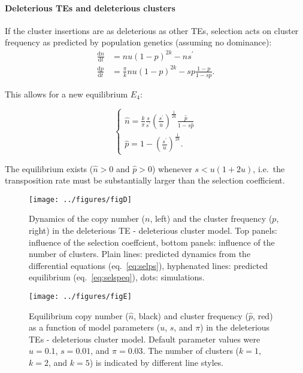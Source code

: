 \documentclass[10pt,a4paper]{article}
\begin{document}
\paragraph{Deleterious TEs and deleterious clusters} If the cluster insertions are as deleterious as other TEs, selection acts on cluster frequency as predicted by population genetics (assuming no dominance): 
\begin{equation}\label{eq:selps}
\begin{split}
\frac{\mathrm d n}{\mathrm d t} &= n u (1-p)^{2k} - n s^\prime \\
\frac{\mathrm d p}{\mathrm d t} &= \frac{\pi}{k} n u (1-p)^{2k} - s p \frac{1-p}{1- s p}.
\end{split}
\end{equation}

This allows for a new equilibrium $E_4$:

\begin{equation}\label{eq:selpseq}
\begin{cases}
\displaystyle \hat n = \frac{k}{\pi}\frac{s}{s^\prime} \left(\frac{s^\prime}{u}\right)^\frac{1}{2k}\frac{\hat p}{1-s\hat p} \\
\displaystyle \hat p = 1 - \left(\frac{s^\prime}{u}\right)^\frac{1}{2k}.
\end{cases}
\end{equation}

The equilibrium exists ($\hat n > 0$ and $\hat p > 0$) whenever $s < u(1+2u)$, i.e.\ the transposition rate must be substantially larger than the selection coefficient. 

\begin{figure}
\begin{adjustwidth}{-2in}{0in}
\begin{center}
	\texttt{[image: ../figures/figD]}
\caption{\label{fig:figD} Dynamics of the copy number ($n$, left) and the cluster frequency ($p$, right) in the deleterious TE - deleterious cluster model. Top panels: influence of the selection coeffcient, bottom panels: influence of the number of clusters. Plain lines: predicted dynamics from the differential equations (eq.~\ref{eq:selps}), hyphenated lines: predicted equilibrium (eq.~\ref{eq:selspeq}), dots: simulations. }
\end{center}\end{adjustwidth}
\end{figure}


\begin{figure}
\begin{adjustwidth}{-1in}{0in}
\begin{center}
	\texttt{[image: ../figures/figE]}
\caption{\label{fig:figE} Equilibrium copy number ($\hat n$, black) and cluster frequency ($\hat p$, red) as a function of model parameters ($u$, $s$, and $\pi$) in the deleterious TEs - deleterious cluster model. Default parameter values were $u=0.1$, $s=0.01$, and $\pi=0.03$. The number of clusters ($k=1$, $k=2$, and $k=5$) is indicated by different line styles. }
\end{center}\end{adjustwidth}
\end{figure}
\end{document}
